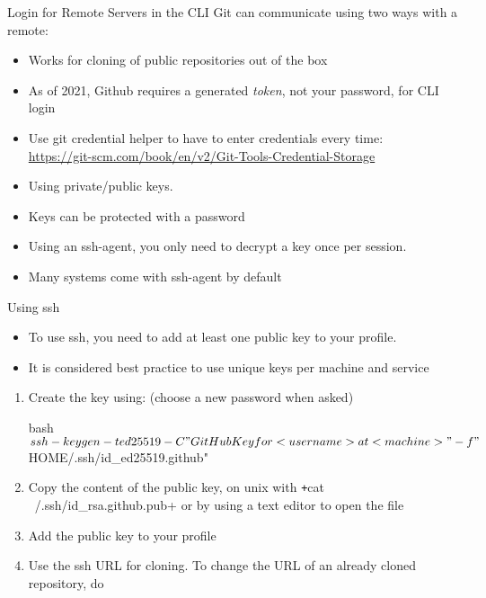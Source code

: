 \begin{frame}[fragile]{Login for Remote Servers in the CLI}
  Git can communicate using two ways with a remote:

  \begin{description}[HTTPS]
    \item[HTTPS]
      \begin{itemize}
        \item Works for cloning of public repositories out of the box
        \item As of 2021, Github requires a generated \emph{token}, not your password, for CLI login
        \item Use git credential helper to have to enter credentials every time:\\
          {\small\url{https://git-scm.com/book/en/v2/Git-Tools-Credential-Storage}}
      \end{itemize}
    \item[SSH]
      \begin{itemize}
        \item Using private/public keys.
        \item Keys can be protected with a password
        \item Using an ssh-agent, you only need to decrypt a key once per session.
        \item Many systems come with ssh-agent by default
      \end{itemize}
  \end{description}
\end{frame}

\begin{frame}[fragile]{Using ssh}

  \begin{itemize}
    \item To use ssh, you need to add at least one public key to your profile.
    \item It is considered best practice to use unique keys per machine and service
  \end{itemize}

  \begin{enumerate}
    \item Create the key using: (choose a new password when asked)
      \begin{code}[title={Works in Powershell (Windows) and Unix Systems}]{bash}
        $ ssh-keygen -t ed25519 -C "GitHub Key for <username> at <machine>" -f "$HOME/.ssh/id_ed25519.github"
      \end{code}
    \item Copy the content of the public key, on unix with \texttt+cat ~/.ssh/id_rsa.github.pub+ or by using a text editor to open the file
    \item Add the public key to your profile
    \item Use the ssh URL for cloning. To change the URL of an already cloned repository, do
  \end{enumerate}
\end{frame}

